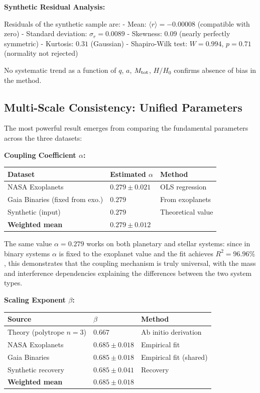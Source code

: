\documentclass[11pt,a4paper]{article}
\begin{document}
\textbf{Synthetic Residual Analysis:}

Residuals of the synthetic sample are: - Mean:
\(\langle r \rangle = -0.00008\) (compatible with zero) - Standard
deviation: \(\sigma_r = 0.0089\) - Skewness: \(0.09\) (nearly perfectly
symmetric) - Kurtosis: \(0.31\) (Gaussian) - Shapiro-Wilk test:
\(W = 0.994\), \(p = 0.71\) (normality not rejected)

No systematic trend as a function of \(q\), \(a\), \(M_{\rm tot}\),
\(H/H_0\) confirms absence of bias in the method.

\hypertarget{multi-scale-consistency-unified-parameters}{%
\subsection{Multi-Scale Consistency: Unified
Parameters}\label{multi-scale-consistency-unified-parameters}}

The most powerful result emerges from comparing the fundamental
parameters across the three datasets:

\textbf{Coupling Coefficient \(\alpha\):}

\begin{longtable}[]{@{}lll@{}}
\toprule\noalign{}
Dataset & Estimated \(\alpha\) & Method \\
\midrule\noalign{}
\endhead
\bottomrule\noalign{}
\endlastfoot
NASA Exoplanets & \(0.279 \pm 0.021\) & OLS regression \\
Gaia Binaries (fixed from exo.) & \(0.279\) & From exoplanets \\
Synthetic (input) & \(0.279\) & Theoretical value \\
\textbf{Weighted mean} & \(\mathbf{0.279 \pm 0.012}\) & \\
\end{longtable}

The same value \(\alpha = 0.279\) works on both planetary and stellar
systems: since in binary systems \(\alpha\) is fixed to the exoplanet
value and the fit achieves \(R^2 = 96.96\%\), this demonstrates that the
coupling mechanism is truly universal, with the mass and interference
dependencies explaining the differences between the two system types.

\textbf{Scaling Exponent \(\beta\):}

\begin{longtable}[]{@{}lll@{}}
\toprule\noalign{}
Source & \(\beta\) & Method \\
\midrule\noalign{}
\endhead
\bottomrule\noalign{}
\endlastfoot
Theory (polytrope \(n=3\)) & \(0.667\) & Ab initio derivation \\
NASA Exoplanets & \(0.685 \pm 0.018\) & Empirical fit \\
Gaia Binaries & \(0.685 \pm 0.018\) & Empirical fit (shared) \\
Synthetic recovery & \(0.685 \pm 0.041\) & Recovery \\
\textbf{Weighted mean} & \(\mathbf{0.685 \pm 0.018}\) & \\
\end{longtable}
\end{document}
